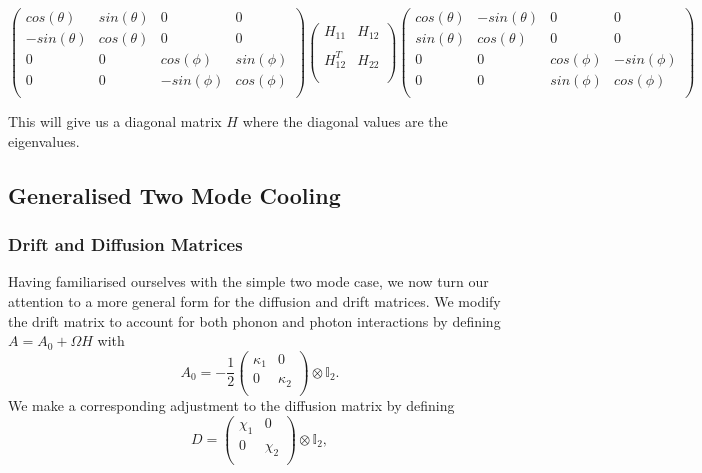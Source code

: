 \documentclass[11pt,a4paper]{article}
\numberwithin{equation}{section}
\begin{document}
	\begin{equation*}
	\begin{pmatrix}
	cos(\theta) & sin(\theta) & 0 & 0\\
	-sin(\theta) & cos(\theta) & 0 & 0\\
	0 & 0 & cos(\phi) & sin(\phi) \\
	0 & 0 & -sin(\phi) & cos(\phi)\\
	\end{pmatrix}	\begin{pmatrix}
	H_{11} & H_{12}\\
	\\
	H^{T}_{12} & H_{22} \\
	\\
	\end{pmatrix}	\begin{pmatrix}
	cos(\theta) & -sin(\theta) & 0 & 0\\
	sin(\theta) & cos(\theta) & 0 & 0\\
	0 & 0 & cos(\phi) & -sin(\phi) \\
	0 & 0 & sin(\phi) & cos(\phi)\\
	\end{pmatrix}
	\end{equation*}	
	
	This will give us a diagonal matrix $H$ where the diagonal values are the eigenvalues. 
	\fi
	
	\subsection{Generalised Two Mode Cooling}\color{black}
	\subsubsection{Drift and Diffusion Matrices}
	\label{sec:optodefs}	

	Having familiarised ourselves with the simple two mode case, we now turn our attention to a more general form for the diffusion and drift matrices. We modify the drift matrix to account for both phonon and photon interactions by defining $A = A_0 +\Omega H$ with
	\begin{equation*}
	A_0 = -\frac{1}{2} \begin{pmatrix}
	\kappa_1 & 0\\
	0 & \kappa_{2}\\
	\end{pmatrix} \otimes \mathbb{I}_2.
	\end{equation*} 
	We make a corresponding adjustment to the diffusion matrix by defining
	\begin{equation*}
	D = \begin{pmatrix}
	\chi_1 & 0\\
	0 & \chi_2\\
	\end{pmatrix} \otimes \mathbb{I}_2,
	\end{equation*}
	
\end{document}
